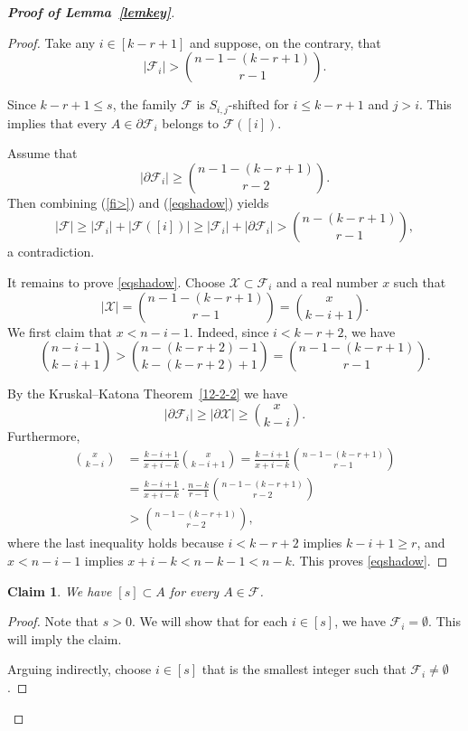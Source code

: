 \documentclass[11pt]{article}
\newcommand{\m}{\mathcal}
\newtheorem{claim}[theorem]{Claim}
\begin{document}
\begin{proof}[{\bf Proof of Lemma~\ref{lemkey}}]
\begin{proof}
Take any $i\in [k-r+1]$ and suppose, on the contrary, that 
\begin{equation}\label{fi>}
    |\mathcal{F}_i|> {n-1-(k-r+1)\choose r-1}.
\end{equation}

Since $k-r+1\le s$, the family $\m F$ is $S_{i,j}$-shifted for $i\le k-r+1$ and $j>i$. This implies that every $A\in \partial \mathcal{F}_i$ belongs to $\m F([i])$.

Assume that 
\begin{equation}\label{eqshadow}
|\partial \mathcal{F}_i |\ge {n-1-(k-r+1)\choose r-2}.
\end{equation} 
Then combining (\ref{fi>}) and (\ref{eqshadow}) yields
\[
|\mathcal{F}|\ge |\mathcal{F}_i|+|\mathcal{F}([i])|
\ge|\mathcal{F}_i|+|\partial\mathcal{F}_i|
>{n-(k-r+1)\choose r-1},
\]
a contradiction.

It remains to prove \eqref{eqshadow}. Choose $\mathcal{X}\subset \mathcal{F}_i$ and a real number $x$ such that
\[
|\mathcal{X}|= {n-1-(k-r+1)\choose r-1}={x\choose k-i+1}.
\]
We first claim that $x< n-i-1$. Indeed, since $i< k-r+2$, we have 
\[
{n-i-1\choose k-i+1} > {n-(k-r+2)-1\choose k-(k-r+2)+1}
={n-1-(k-r+1)\choose r-1}.
\]

By the Kruskal--Katona Theorem~\ref{12-2-2} we have   
\[
|\partial \mathcal{F}_i | \ge |\partial \mathcal{X}|\ge {x\choose k-i}.
\]
Furthermore,
\begin{align*}
{x\choose k-i}
&=\frac{k-i+1}{x+i-k}{x\choose k-i+1}
=\frac{k-i+1}{x+i-k}{n-1-(k-r+1)\choose r-1}\\
&=\frac{k-i+1}{x+i-k}\cdot \frac{n-k}{r-1}{n-1-(k-r+1)\choose r-2}\\
&>{n-1-(k-r+1)\choose r-2},
\end{align*}
where the last inequality holds because $i<k-r+2$ implies $k-i+1\ge r$, and $x< n-i-1$ implies $x+i-k<n-k-1<n-k$. This proves \eqref{eqshadow}.
\end{proof}

\begin{claim}\label{1-8-2}
We have $[s]\subset A$ for every $A\in \m F$. 
\end{claim}

\begin{proof}
Note that $s>0$. 
We will show that for each $i\in [s]$, we have $ \mathcal{F}_i= \emptyset$. This will imply the claim. 

Arguing indirectly, choose $i\in [s]$ that is the smallest integer such that $ \mathcal{F}_i\ne \emptyset$.


\end{proof}
\end{proof}
\end{document}

